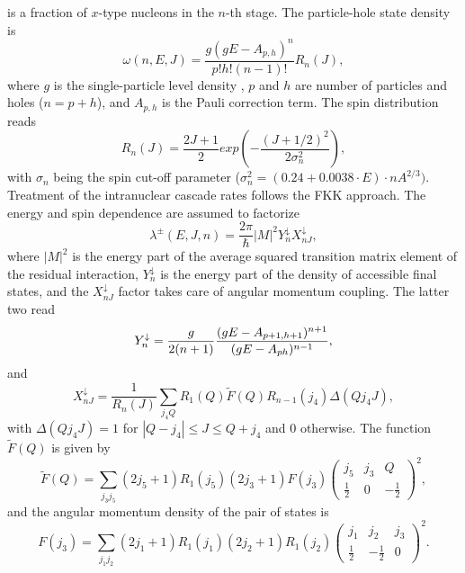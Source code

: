 is a fraction of $x$-type nucleons in the $n$-th stage. The particle-hole
state density is 
\begin{equation}
\omega (n,E,J)=\frac{g(gE-A_{p,h})^{n}}{p!h!(n-1)!}R_{n}(J),
\end{equation}%
\noindent where $g$ is the single-particle level density%
, $p$ and $h$ are number of particles and holes ($%
n=p+h$), and $A_{p,h}$ is the Pauli correction term. The spin distribution
reads 
\begin{equation}
R_{n}(J)=%
\frac{2J+1}{2}exp\left( -\frac{(J+1/2)^{2}}{2\sigma _{n}^{2}}\right) ,
\end{equation}%
with $\sigma _{n}$ being the spin cut-off parameter ($\sigma
_{n}^{2}=(0.24+0.0038\cdot E)\cdot nA^{2/3}).$ Treatment of the intranuclear
cascade rates follows the FKK \cite{FKK} approach. The energy and spin
dependence are assumed to factorize 
\begin{equation}
\lambda ^{\pm }(E,J,n)=\frac{2\pi }{\hbar }|M|^{2}Y_{n}^{\downarrow
}X_{nJ}^{\downarrow },
\end{equation}%
\noindent where $|M|^{2}$ is the energy part of the average squared
transition matrix element of the residual interaction, $Y_{n}^{\downarrow }$
is the energy part of the density of accessible final states, and the $%
X_{nJ}^{\downarrow }$ factor takes care of angular momentum coupling. The
latter two read 
\begin{equation}
Y_{n}^{\downarrow }=\frac{g}{2(n+1)}\frac{(gE-A_{p+1,h+1})^{n+1}}{%
(gE-A_{ph})^{n-1}},
\end{equation}%
and 
\begin{equation}
X_{nJ}^{\downarrow }=\frac{1}{R_{n}(J)}\sum_{j_{4}Q}R_{1}(Q)\widetilde{F}%
(Q)R_{n-1}(j_{4})\Delta (Qj_{4}J),
\end{equation}%
with $\Delta (Qj_{4}J)=1$ for $|Q-j_{4}|\leq J\leq Q+j_{4}$ and 0 otherwise.
The function $\widetilde{F}(Q)$ is given by 
\begin{equation}
\widetilde{F}(Q)=\sum_{j_{3}j_{5}}(2j_{5}+1)R_{1}(j_{5})(2j_{3}+1)F(j_{3})%
\left( 
\begin{array}{ccc}
j_{5} & j_{3} & Q \\ 
\frac{1}{2} & 0 & -\frac{1}{2}%
\end{array}%
\right) ^{2},
\end{equation}%
and the angular momentum density of the pair of states is 
\begin{equation}
F(j_{3})=\sum_{j_{1}j_{2}}(2j_{1}+1)R_{1}(j_{1})(2j_{2}+1)R_{1}(j_{2})\left( 
\begin{array}{ccc}
j_{1} & j_{2} & j_{3} \\ 
\frac{1}{2} & -\frac{1}{2} & 0%
\end{array}%
\right) ^{2}.
\end{equation}%
